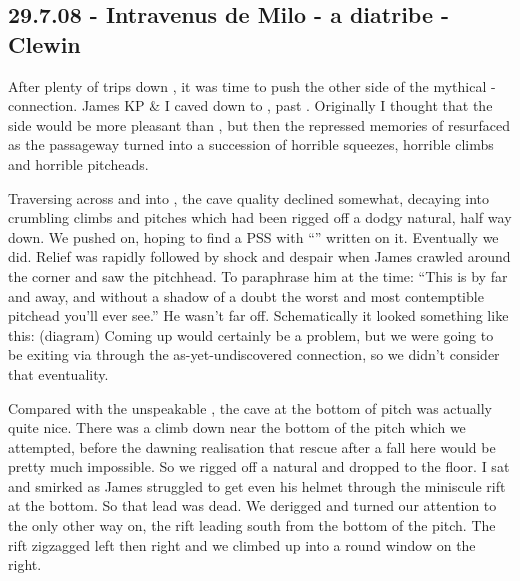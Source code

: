 \subsection{29.7.08 - Intravenus de Milo - a diatribe -
Clewin}


After plenty of trips down , it was time to push the other side
of the mythical - connection. James KP
\& I caved down to , past . Originally I thought that the  side
would be more pleasant than , but then the repressed memories
of  resurfaced as the passageway turned into a
succession of horrible squeezes, horrible climbs and horrible pitcheads.



Traversing across  and into , the cave
quality declined somewhat, decaying into crumbling climbs and pitches
which had been rigged off a dodgy natural, half way down. We pushed on,
hoping to find a PSS with ``'' written on it.
Eventually we did. Relief was rapidly followed by shock and despair when
James crawled around the corner and saw the 
pitchhead. To paraphrase him at the time: ``This is by far and away, and
without a shadow of a doubt the worst and most contemptible pitchead
you'll ever see.'' He wasn't far off. Schematically it looked something
like this: (diagram) Coming up would certainly be a problem, but we were
going to be exiting via  through the as-yet-undiscovered
connection, so we didn't consider that eventuality.

Compared with the unspeakable , the cave at the bottom of
 pitch was actually quite nice. There was a climb down
near the bottom of the pitch which we attempted, before the dawning
realisation that rescue after a fall here would be pretty much
impossible. So we rigged off a natural and dropped to the floor. I sat
and smirked as James struggled to get even his helmet through the
miniscule rift at the bottom. So that lead was dead. We derigged and
turned our attention to the only other way on, the rift leading south
from the bottom of the pitch. The rift zigzagged left then right and we
climbed up into a round window on the right.

